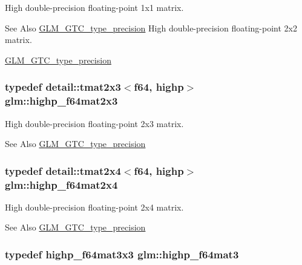 High double-\/precision floating-\/point 1x1 matrix. \begin{DoxySeeAlso}{See Also}
\hyperlink{group__gtc__type__precision}{G\-L\-M\-\_\-\-G\-T\-C\-\_\-type\-\_\-precision} High double-\/precision floating-\/point 2x2 matrix. 

\hyperlink{group__gtc__type__precision}{G\-L\-M\-\_\-\-G\-T\-C\-\_\-type\-\_\-precision} 
\end{DoxySeeAlso}
\hypertarget{group__gtc__type__precision_gafb5b42b29b3bd7f1605483223fa35312}{
\subsubsection[{highp\-\_\-f64mat2x3}]{\setlength{\rightskip}{0pt plus 5cm}typedef detail\-::tmat2x3$<$f64, highp$>$ {\bf glm\-::highp\-\_\-f64mat2x3}}}\label{group__gtc__type__precision_gafb5b42b29b3bd7f1605483223fa35312}
High double-\/precision floating-\/point 2x3 matrix. \begin{DoxySeeAlso}{See Also}
\hyperlink{group__gtc__type__precision}{G\-L\-M\-\_\-\-G\-T\-C\-\_\-type\-\_\-precision} 
\end{DoxySeeAlso}
\hypertarget{group__gtc__type__precision_ga72fae79e6633cbc6bf691f69278b36d3}{
\subsubsection[{highp\-\_\-f64mat2x4}]{\setlength{\rightskip}{0pt plus 5cm}typedef detail\-::tmat2x4$<$f64, highp$>$ {\bf glm\-::highp\-\_\-f64mat2x4}}}\label{group__gtc__type__precision_ga72fae79e6633cbc6bf691f69278b36d3}
High double-\/precision floating-\/point 2x4 matrix. \begin{DoxySeeAlso}{See Also}
\hyperlink{group__gtc__type__precision}{G\-L\-M\-\_\-\-G\-T\-C\-\_\-type\-\_\-precision} 
\end{DoxySeeAlso}
\hypertarget{group__gtc__type__precision_ga00c5743b0eba6b437422571f4eda27b8}{
\subsubsection[{highp\-\_\-f64mat3}]{\setlength{\rightskip}{0pt plus 5cm}typedef highp\-\_\-f64mat3x3 {\bf glm\-::highp\-\_\-f64mat3}}}\label{group__gtc__type__precision_ga00c5743b0eba6b437422571f4eda27b8}
